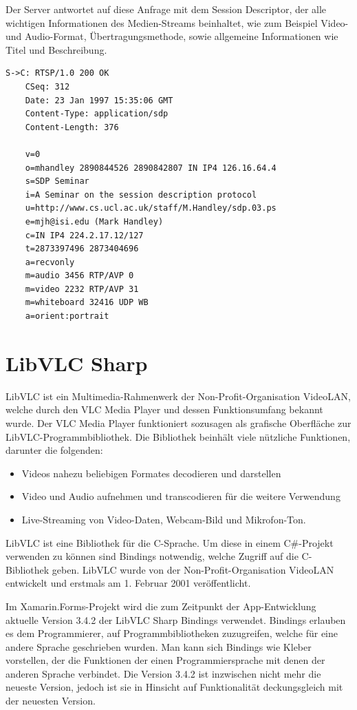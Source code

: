 Der Server antwortet auf diese Anfrage mit dem Session Descriptor, der alle wichtigen Informationen des Medien-Streams beinhaltet, wie zum Beispiel Video- und Audio-Format, Übertragungsmethode, sowie allgemeine Informationen wie Titel und Beschreibung.
\begin{verbatim}
S->C: RTSP/1.0 200 OK
    CSeq: 312
    Date: 23 Jan 1997 15:35:06 GMT
    Content-Type: application/sdp
    Content-Length: 376

    v=0
    o=mhandley 2890844526 2890842807 IN IP4 126.16.64.4
    s=SDP Seminar
    i=A Seminar on the session description protocol
    u=http://www.cs.ucl.ac.uk/staff/M.Handley/sdp.03.ps
    e=mjh@isi.edu (Mark Handley)
    c=IN IP4 224.2.17.12/127
    t=2873397496 2873404696
    a=recvonly
    m=audio 3456 RTP/AVP 0
    m=video 2232 RTP/AVP 31
    m=whiteboard 32416 UDP WB
    a=orient:portrait
\end{verbatim}

\section{LibVLC Sharp}
LibVLC ist ein Multimedia-Rahmenwerk der Non-Profit-Organisation VideoLAN, welche durch den VLC Media Player und dessen Funktionsumfang bekannt wurde. Der VLC Media Player funktioniert sozusagen als grafische Oberfläche zur LibVLC-Programmbibliothek.
Die Bibliothek beinhält viele nützliche Funktionen, darunter die folgenden:
\begin{itemize}
    \item Videos nahezu beliebigen Formates decodieren und darstellen
    \item Video und Audio aufnehmen und transcodieren für die weitere Verwendung
    \item Live-Streaming von Video-Daten, Webcam-Bild und Mikrofon-Ton.
\end{itemize}    
LibVLC ist eine Bibliothek für die C-Sprache. Um diese in einem C\#-Projekt verwenden zu können sind Bindings notwendig, welche Zugriff auf die C-Bibliothek geben.
LibVLC wurde von der Non-Profit-Organisation VideoLAN entwickelt und erstmals am 1. Februar 2001 veröffentlicht.\cite[vgl.][]{libvlc-release}\par

Im Xamarin.Forms-Projekt wird die zum Zeitpunkt der App-Entwicklung aktuelle Version 3.4.2 der LibVLC Sharp Bindings verwendet. Bindings erlauben es dem Programmierer, auf Programmbibliotheken zuzugreifen, welche für eine andere Sprache geschrieben wurden. Man kann sich Bindings wie Kleber vorstellen, der die Funktionen der einen Programmiersprache mit denen der anderen Sprache verbindet. Die Version 3.4.2 ist inzwischen nicht mehr die neueste Version, jedoch ist sie in Hinsicht auf Funktionalität deckungsgleich mit der neuesten Version.\par

